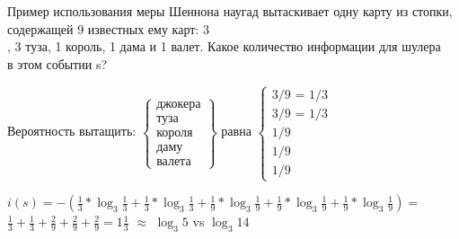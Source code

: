 \documentclass[9pt,aspectratio=169]{beamer}
\begin{document}
	\begin{frame}{Пример использования меры Шеннона}
	    \vspace*{-20mm}
	     наугад вытаскивает одну карту из стопки, содержащей 9 известных ему карт: 3\\
        , 3 туза, 1 король, 1 дама и 1 валет. Какое количество информации для шулера\\
         в этом событии s?
        
        Вероятность вытащить: $\left\{
        \begin{array}{l}
             \mbox{джокера}\\
             \mbox{туза}\\
             \mbox{короля}\\
             \mbox{даму}\\
             \mbox{валета}
        \end{array}\right\}$ равна $\left\{
        \begin{array}{l}
             \mbox{3/9 = 1/3}\\
             \mbox{3/9 = 1/3}\\
             \mbox{1/9}\\
             \mbox{1/9}\\
             \mbox{1/9}
        \end{array}
        \right .$ \\
        \begin{center}
        
        $i(s) = -(\frac{1}{3}*\log_3{\frac{1}{3}} + \frac{1}{3}*\log_3{\frac{1}{3}} + \frac{1}{9}*\log_3{\frac{1}{9}} + \frac{1}{9}*\log_3{\frac{1}{9}} + \frac{1}{9}*\log_3{\frac{1}{9}}) = $\\
        $\frac{1}{3} + \frac{1}{3} + \frac{2}{9} + \frac{2}{9} + \frac{2}{9} = 1\frac{1}{3}$ $\approx$ $\log_3{5}$ vs $\log_3{14}$ 
        \end{center} 
	\end{frame}
\end{document}
